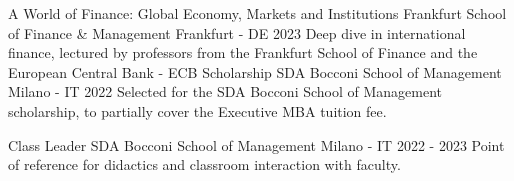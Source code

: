 
\begin{cventries}
  \cventry
  {A World of Finance: Global Economy, Markets and Institutions} %
  {Frankfurt School of Finance \& Management} %
  {}
  {Frankfurt - DE} %
  {2023} %
  {
    Deep dive in international finance, lectured by professors from the Frankfurt School of Finance and the European Central Bank - ECB
  }
  \cventry
    {Scholarship} %
    {SDA Bocconi School of Management} %
    {}
    {Milano - IT} %
    {2022} %
    {
      Selected for the SDA Bocconi School of Management scholarship, to partially cover the Executive MBA tuition fee.
    }
    
  \cventry
  {Class Leader} %
  {SDA Bocconi School of Management} %
  {}
  {Milano - IT} %
  {2022 - 2023} %
  {
    Point of reference for didactics and classroom interaction with faculty.
  }
\end{cventries}